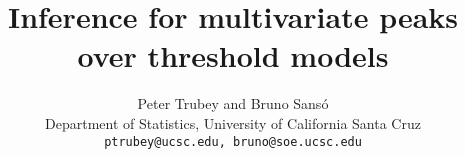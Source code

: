 \documentclass{article}
\title{Inference for multivariate peaks over threshold models}
\author{Peter Trubey and Bruno Sans\'o\\
Department of Statistics, University of California Santa Cruz\\
{\tt ptrubey@ucsc.edu, bruno@soe.ucsc.edu}}
\begin{document}
\maketitle
\thispagestyle{empty}
\begin{abstract}
  
\end{abstract}















\end{document}
